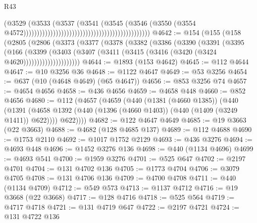 \begin{lexlean}{R43}
\begin{coremodule}
                                                                                  (@3529
                                                                                    (@3533
                                                                                      (@3537
                                                                                        (@3541
                                                                                          (@3545
                                                                                            (@3546
                                                                                              (@3550
                                                                                                (@3554
                                                                                                  @4572)))))))))))))))))))))))))))))))))))))))))))))))
@4642 := @154
    (@155
      (@158
        (@2805
          (@2806
            (@3373
              (@3377
                (@3378
                  (@3382
                    (@3386
                      (@3390
                        (@3391
                          (@3395
                            (@166
                              (@3399
                                (@3403
                                  (@3407
                                    (@3411 (@3415 (@3416 (@3420 (@3424 @4620)))))))))))))))))))))
@4644 := @1893 (@153 @4642)
@4645 := @112 @4644
@4647 := @10 @3256 @36
@4648 := @1122 @4647
@4649 := @53 @3256
@4654 := @637 (@10 (@4648 @4649) (@65 @4647))
@4656 := @853 @3256 @74
@4657 := @4654 @4656
@4658 := @436 @4656
@4659 := @4658 @448
@4660 := @852 @4656
@4680 := @112
    (@4657
      (@4659
        (@440
          (@1381 (@4660 @1385))
          (@440
            (@1391 (@4658 @1392 (@440 (@1396 (@4660 @1403)) (@440 (@1409 (@3249 @1411)) @622))))
            @622))))
@4682 := @122 @4647 @4649
@4685 := @19 @3663 (@22 @3663)
@4688 := @4682 (@128 @4685 @137)
@4689 := @112 @4688
@4690 := @1753 @2110
@4692 := @1017 @1752 @2129
@4693 := @436 @3276
@4694 := @4693 @448
@4696 := @1452 @3276 @136
@4698 := @440 (@1134 @4696)
@4699 := @4693 @541
@4700 := @1959 @3276
@4701 := @525 @647
@4702 := @2197 @4701
@4704 := @131 @4702 @136
@4705 := @1773 @4704
@4706 := @3079 @4705
@4708 := @131 @4706 @136
@4709 := @4700 @4708
@4711 := @440 (@1134 @4709)
@4712 := @549 @573
@4713 := @1137 @4712
@4716 := @19 @3668 (@22 @3668)
@4717 := @128 @4716
@4718 := @525 @564
@4719 := @4717 @4718
@4721 := @131 @4719 @647
@4722 := @2197 @4721
@4724 := @131 @4722 @136

\end{coremodule}
\end{lexlean}
